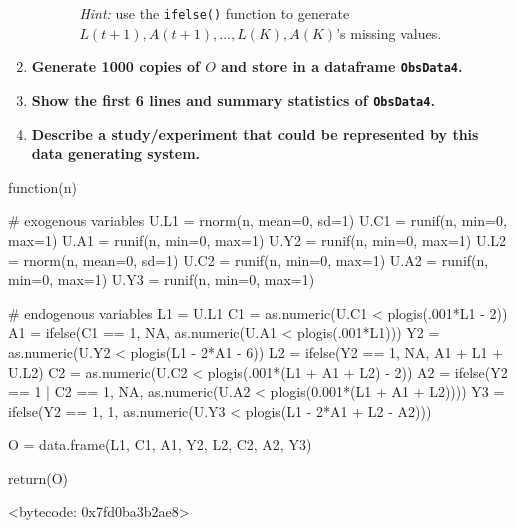 \documentclass{exam}
\begin{document}
\begin{enumerate}
\begin{enumerate}
\begin{itemize}
\emph{Hint:} use the \texttt{ifelse()} function to generate $L(t+1), A(t+1), ... , L(K), A(K)$'s missing values.
\end{itemize}
\end{enumerate}
\item \textbf{Generate 1000 copies of $O$ and store in a dataframe \texttt{ObsData4}.}
\item \textbf{Show the first 6 lines and summary statistics of \texttt{ObsData4}.}
\item \textbf{Describe a study/experiment that could be represented by this data generating system.}
\end{enumerate}


\begin{solution}

\begin{Schunk}
\end{Schunk}
\begin{Schunk}
\begin{Soutput}
function(n) {
  
  # exogenous variables
  U.L1 = rnorm(n, mean=0, sd=1)
  U.C1 = runif(n, min=0, max=1)
  U.A1 = runif(n, min=0, max=1)
  U.Y2 = runif(n, min=0, max=1)
  U.L2 = rnorm(n, mean=0, sd=1)
  U.C2 = runif(n, min=0, max=1)
  U.A2 = runif(n, min=0, max=1)
  U.Y3 = runif(n, min=0, max=1)
  
  # endogenous variables
  L1 = U.L1
  C1 = as.numeric(U.C1 < plogis(.001*L1 - 2))
  A1 = ifelse(C1 == 1, NA, as.numeric(U.A1 < plogis(.001*L1)))
  Y2 = as.numeric(U.Y2 < plogis(L1 - 2*A1 - 6))
  L2 = ifelse(Y2 == 1, NA, A1 + L1 + U.L2)
  C2 = as.numeric(U.C2 < plogis(.001*(L1 + A1 + L2) - 2))
  A2 = ifelse(Y2 == 1 | C2 == 1, NA, as.numeric(U.A2 < plogis(0.001*(L1 + A1 + L2))))
  Y3 = ifelse(Y2 == 1, 1, as.numeric(U.Y3 < plogis(L1 - 2*A1 + L2 - A2)))
  
  O = data.frame(L1, C1, A1, Y2, L2, C2, A2, Y3)
  
  return(O)
  
}
<bytecode: 0x7fd0ba3b2ae8>
\end{Soutput}
\end{Schunk}


\end{solution}
\end{document}
